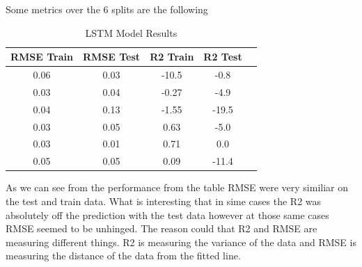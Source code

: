 \documentclass{imc-inf}
\begin{document}
			Some metrics over the 6 splits are the following
			\begin{table}[h!]
				\centering
				\begin{tabular}{|c|c|c|c|c|}
					\hline
					\textbf{RMSE Train} & \textbf{RMSE Test} & \textbf{R2 Train} & \textbf{R2 Test} \\ \hline
					0.06 & 0.03 & -10.5& -0.8 \\ \hline
					0.03 & 0.04 & -0.27& -4.9 \\ \hline
					0.04 & 0.13 & -1.55& -19.5 \\ \hline
					0.03 & 0.05 & 0.63& -5.0 \\ \hline
					0.03 & 0.01 & 0.71& 0.0 \\ \hline
					0.05 & 0.05 & 0.09 & -11.4 \\ \hline
					
				\end{tabular}
				\caption{LSTM Model Results}
				\label{tab:lstm_model_results}

			\end{table}

			As we can see from the performance from the table RMSE were very similiar on the test and train data. What is interesting that in sime cases the R2 was absolutely off the prediction with the test data 
			however at those same cases RMSE seemed to be unhinged.	The reason could that R2 and RMSE are measuring different things. R2 is measuring the variance of the data and RMSE is measuring the distance of
			the data from the fitted line.
\end{document}
